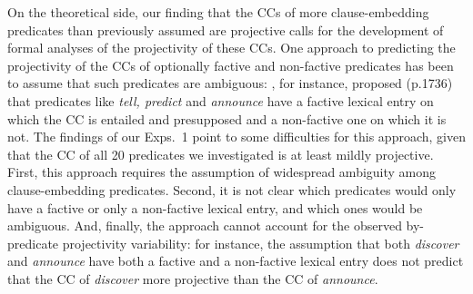 \documentclass[11pt,fleqn]{article}
\newcommand{\6}{\mbox{$[\hspace*{-.6mm}[$}}
\newcommand{\9}{\mbox{$]\hspace*{-.6mm}]$}}
\begin{document}
{On the theoretical side, our finding that the CCs of more clause-embedding predicates than previously assumed are projective calls for the development of formal analyses of the projectivity of these CCs. One approach to predicting the projectivity of the CCs of optionally factive and non-factive predicates has been to assume that such predicates are ambiguous: \citet{spector-egre2015}, for instance, proposed (p.1736) that predicates like {\em tell, predict} and {\em announce}  have a factive lexical entry on which the CC is entailed and presupposed and a non-factive one on which it is not. The findings of our Exps.~1 point to some difficulties for this approach, given that the CC of all 20 predicates we investigated is at least mildly projective. First, this approach requires the assumption of widespread ambiguity among clause-embedding predicates. Second, it is not clear which predicates would only have a factive or only a non-factive lexical entry, and which ones would be ambiguous. And, finally, the approach cannot account for the observed by-predicate projectivity variability: for instance, the assumption that both {\em discover} and {\em announce}  have both a factive and a non-factive lexical entry does not predict that the CC of {\em discover} more projective than the CC of {\em announce}.

}
\end{document}
